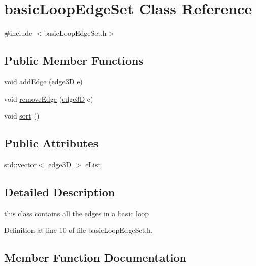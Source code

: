 \hypertarget{classbasic_loop_edge_set}{}\section{basic\+Loop\+Edge\+Set Class Reference}
\label{classbasic_loop_edge_set}


{\ttfamily \#include $<$basic\+Loop\+Edge\+Set.\+h$>$}

\subsection*{Public Member Functions}
\begin{DoxyCompactItemize}
\item 
void \mbox{\hyperlink{classbasic_loop_edge_set_a796243033ab3276548e7ff644705dddc}{add\+Edge}} (\mbox{\hyperlink{structedge3_d}{edge3D}} e)
\item 
void \mbox{\hyperlink{classbasic_loop_edge_set_aa58522d2678542f6c50888944f7fea4b}{remove\+Edge}} (\mbox{\hyperlink{structedge3_d}{edge3D}} e)
\item 
void \mbox{\hyperlink{classbasic_loop_edge_set_addb31fe543f58c29b77205f724afb1af}{sort}} ()
\end{DoxyCompactItemize}
\subsection*{Public Attributes}
\begin{DoxyCompactItemize}
\item 
std\+::vector$<$ \mbox{\hyperlink{structedge3_d}{edge3D}} $>$ \mbox{\hyperlink{classbasic_loop_edge_set_a30772bbabe3b0b80f3c3dfe7b7ac8c48}{e\+List}}
\end{DoxyCompactItemize}


\subsection{Detailed Description}
this class contains all the edges in a basic loop 

Definition at line 10 of file basic\+Loop\+Edge\+Set.\+h.



\subsection{Member Function Documentation}
\mbox{\label{classbasic_loop_edge_set_a796243033ab3276548e7ff644705dddc}} 
